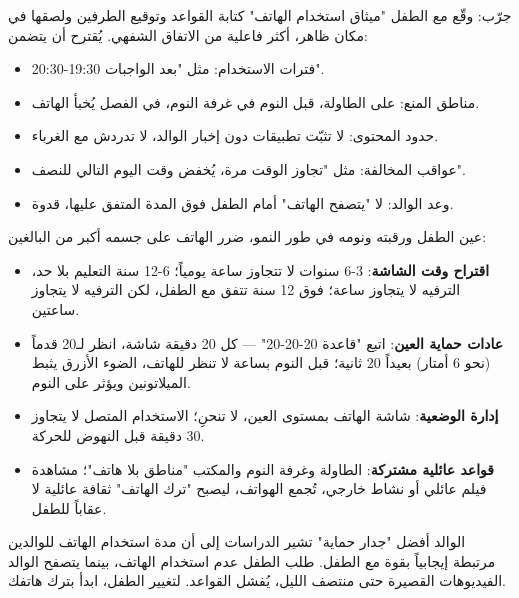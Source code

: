 \begin{tcbpractice}{جرّب: وقّع مع الطفل "ميثاق استخدام الهاتف"}
كتابة القواعد وتوقيع الطرفين ولصقها في مكان ظاهر، أكثر فاعلية من الاتفاق الشفهي. يُقترح أن يتضمن:

\begin{itemize}
  \item فترات الاستخدام: مثل "بعد الواجبات 19:30-20:30".
  \item مناطق المنع: على الطاولة، قبل النوم في غرفة النوم، في الفصل يُخبأ الهاتف.
  \item حدود المحتوى: لا تثبّت تطبيقات دون إخبار الوالد، لا تدردش مع الغرباء.
  \item عواقب المخالفة: مثل "تجاوز الوقت مرة، يُخفض وقت اليوم التالي للنصف".
  \item وعد الوالد: لا "يتصفح الهاتف" أمام الطفل فوق المدة المتفق عليها، قدوة.
\end{itemize}

\end{tcbpractice}


عين الطفل ورقبته ونومه في طور النمو، ضرر الهاتف على جسمه أكبر من البالغين:

\begin{itemize}
  \item \textbf{اقتراح وقت الشاشة}: 3-6 سنوات لا تتجاوز ساعة يومياً؛ 6-12 سنة التعليم بلا حد، الترفيه لا يتجاوز ساعة؛ فوق 12 سنة تتفق مع الطفل، لكن الترفيه لا يتجاوز ساعتين.
  \item \textbf{عادات حماية العين}: اتبع "قاعدة 20-20-20" — كل 20 دقيقة شاشة، انظر لـ20 قدماً (نحو 6 أمتار) بعيداً 20 ثانية؛ قبل النوم بساعة لا تنظر للهاتف، الضوء الأزرق يثبط الميلاتونين ويؤثر على النوم.
  \item \textbf{إدارة الوضعية}: شاشة الهاتف بمستوى العين، لا تنحنِ؛ الاستخدام المتصل لا يتجاوز 30 دقيقة قبل النهوض للحركة.
  \item \textbf{قواعد عائلية مشتركة}: الطاولة وغرفة النوم والمكتب "مناطق بلا هاتف"؛ مشاهدة فيلم عائلي أو نشاط خارجي، تُجمع الهواتف، ليصبح "ترك الهاتف" ثقافة عائلية لا عقاباً للطفل.
\end{itemize}

\begin{tcbinfo}{الوالد أفضل "جدار حماية"}
تشير الدراسات إلى أن مدة استخدام الهاتف للوالدين مرتبطة إيجابياً بقوة مع الطفل. طلب الطفل عدم استخدام الهاتف، بينما يتصفح الوالد الفيديوهات القصيرة حتى منتصف الليل، يُفشل القواعد. لتغيير الطفل، ابدأ بترك هاتفك.

\end{tcbinfo}


